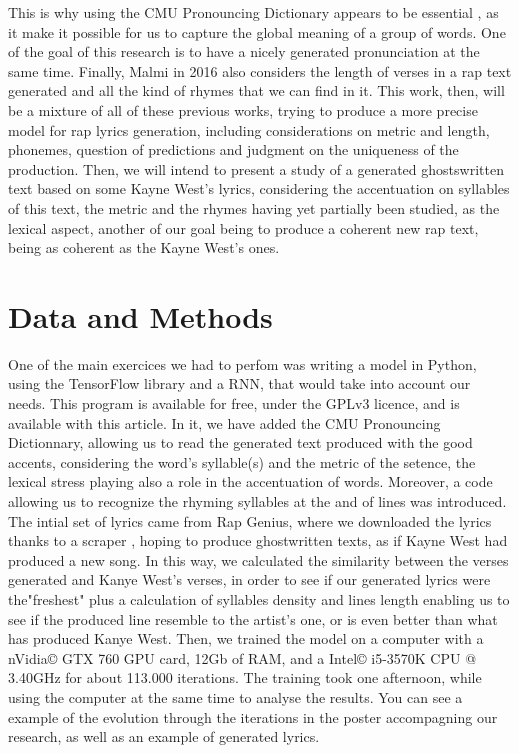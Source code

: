 \documentclass[12pt,a4paper]{article}
\begin{document}
This is why using the CMU Pronouncing Dictionary appears to be essential \cite{hirjee_using_2010}, as it make it possible for us to capture the global meaning of a group of words. One of the goal of this research is to have a nicely generated pronunciation at the same time. Finally, Malmi in 2016 also considers the length of verses in a rap text generated and all the kind of rhymes that we can find in it. This work, then, will be a mixture of all of these previous works, trying to produce a more precise model for rap lyrics generation, including considerations on metric and length, phonemes, question of predictions and judgment on the uniqueness of the production. Then, we will intend to present a study of a generated ghostswritten text based on some Kayne West's lyrics, considering the accentuation on syllables of this text, the metric and the rhymes having yet partially been studied, as the lexical aspect, another of our goal being to produce a coherent new rap text, being as coherent as the Kayne West's ones. \newline

\section{Data and Methods}

One of the main exercices we had to perfom was writing a model in Python, using the TensorFlow library and a RNN, that would take into account our needs. This program is available for free, under the GPLv3 licence, and is available with this article. In it, we have added the CMU Pronouncing Dictionnary, allowing us to read the generated text produced with the good accents, considering the word's syllable(s) and the metric of the setence, the lexical stress playing also a role in the accentuation of words. Moreover, a code allowing us to recognize the rhyming syllables at the and of lines was introduced. The intial set of lyrics came from Rap Genius, where we downloaded the lyrics thanks to a scraper \cite{paupier_raplyrics-scraper_2018}, hoping to produce ghostwritten texts, as if Kayne West had produced a new song. In this way, we calculated the similarity between the verses generated and Kanye West's verses, in order to see if our generated lyrics were the"freshest" plus a calculation of syllables density and lines length enabling us to see if the produced line resemble to the artist’s one, or is even better than what has produced Kanye West. Then, we trained the model on a computer with a nVidia© GTX 760 GPU card, 12Gb of RAM, and a Intel©  i5-3570K CPU @ 3.40GHz for about 113.000 iterations. The training took one afternoon, while using the computer at the same time to analyse the results. You can see a example of the evolution through the iterations in the poster accompagning our research, as well as an example of generated lyrics. \newline
\end{document}
